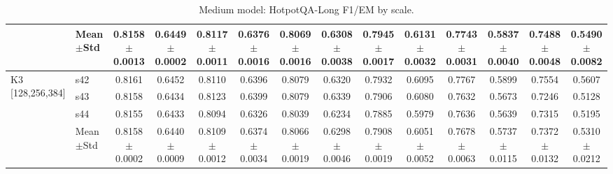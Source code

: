 \begin{table}[t]
\begin{tabular}{llcccccccccccc}
 & Mean$\pm$Std & 0.8158$\pm$0.0013 & 0.6449$\pm$0.0002 & 0.8117$\pm$0.0011 & 0.6376$\pm$0.0016 & 0.8069$\pm$0.0016 & 0.6308$\pm$0.0038 & 0.7945$\pm$0.0017 & 0.6131$\pm$0.0032 & 0.7743$\pm$0.0031 & 0.5837$\pm$0.0040 & 0.7488$\pm$0.0048 & 0.5490$\pm$0.0082 \\
\midrule
\multirow{4}{*}{K3 [128,256,384]} & s42 & 0.8161 & 0.6452 & 0.8110 & 0.6396 & 0.8079 & 0.6320 & 0.7932 & 0.6095 & 0.7767 & 0.5899 & 0.7554 & 0.5607 \\
 & s43 & 0.8158 & 0.6434 & 0.8123 & 0.6399 & 0.8079 & 0.6339 & 0.7906 & 0.6080 & 0.7632 & 0.5673 & 0.7246 & 0.5128 \\
 & s44 & 0.8155 & 0.6433 & 0.8094 & 0.6326 & 0.8039 & 0.6234 & 0.7885 & 0.5979 & 0.7636 & 0.5639 & 0.7315 & 0.5195 \\
 & Mean$\pm$Std & 0.8158$\pm$0.0002 & 0.6440$\pm$0.0009 & 0.8109$\pm$0.0012 & 0.6374$\pm$0.0034 & 0.8066$\pm$0.0019 & 0.6298$\pm$0.0046 & 0.7908$\pm$0.0019 & 0.6051$\pm$0.0052 & 0.7678$\pm$0.0063 & 0.5737$\pm$0.0115 & 0.7372$\pm$0.0132 & 0.5310$\pm$0.0212 \\
\bottomrule
\end{tabular}
\caption{Medium model: HotpotQA-Long F1/EM by scale.}
\label{tab:appendix_medium_hotpot}
\end{table}

